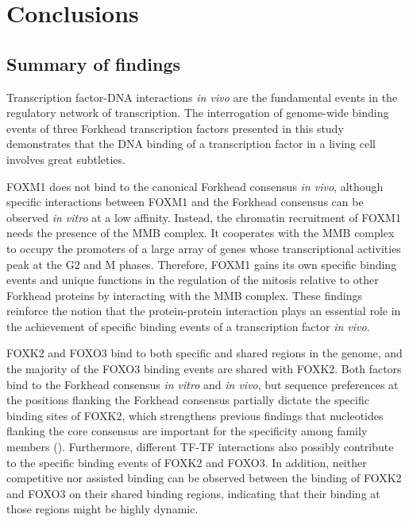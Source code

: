 \chapter{Conclusions} \label{ch:conclusions}

\section{Summary of findings}

Transcription factor-DNA interactions \textit{in vivo} are the fundamental events in the regulatory network of transcription. The interrogation of genome-wide binding events of three Forkhead transcription factors presented in this study demonstrates that the DNA binding of a transcription factor in a living cell involves great subtleties.

FOXM1 does not bind to the canonical Forkhead consensus \textit{in vivo}, although specific interactions between FOXM1 and the Forkhead consensus can be observed \textit{in vitro} at a low affinity. Instead, the chromatin recruitment of FOXM1 needs the presence of the MMB complex. It cooperates with the MMB complex to occupy the promoters of a large array of genes whose transcriptional activities peak at the G2 and M phases. Therefore, FOXM1 gains its own specific binding events and unique functions in the regulation of the mitosis relative to other Forkhead proteins by interacting with the MMB complex. These findings reinforce the notion that the protein-protein interaction plays an essential role in the achievement of specific binding events of a transcription factor \textit{in vivo}.

FOXK2 and FOXO3 bind to both specific and shared regions in the genome, and the majority of the FOXO3 binding events are shared with FOXK2. Both factors bind to the Forkhead consensus \textit{in vitro} and \textit{in vivo}, but sequence preferences at the positions flanking the Forkhead consensus partially dictate the specific binding sites of FOXK2, which strengthens previous findings that nucleotides flanking the core consensus are important for the specificity among family members (\cite{wei2010genome-wide}). Furthermore, different TF-TF interactions also possibly contribute to the specific binding events of FOXK2 and FOXO3. In addition, neither competitive nor assisted binding can be observed between the binding of FOXK2 and FOXO3 on their shared binding regions, indicating that their binding at those regions might be highly dynamic.

